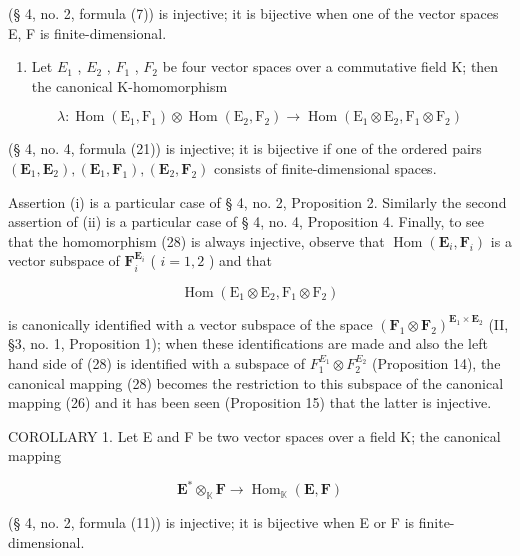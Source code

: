 (§ 4, no. 2, formula (7)) is injective; it is bijective when one of the vector spaces E, F is finite-dimensional.

\begin{enumerate}
\def\labelenumi{(\roman{enumi})}
\setcounter{enumi}{1}
\tightlist
\item
  Let \(E_{1}\) , \(E_{2}\) , \(F_{1}\) , \(F_{2}\) be four vector spaces over a commutative field K; then the canonical K-homomorphism
\end{enumerate}

\[
\lambda : \operatorname{Hom} \left(\mathrm{E} _ {1}, \mathrm{F} _ {1}\right) \otimes \operatorname{Hom} \left(\mathrm{E} _ {2}, \mathrm{F} _ {2}\right)\rightarrow \operatorname{Hom} \left(\mathrm{E} _ {1} \otimes \mathrm{E} _ {2}, \mathrm{F} _ {1} \otimes \mathrm{F} _ {2}\right)\tag{28}
\]

(§ 4, no. 4, formula (21)) is injective; it is bijective if one of the ordered pairs \((\mathbf{E}_1, \mathbf{E}_2), (\mathbf{E}_1, \mathbf{F}_1), (\mathbf{E}_2, \mathbf{F}_2)\) consists of finite-dimensional spaces.

Assertion (i) is a particular case of § 4, no. 2, Proposition 2. Similarly the second assertion of (ii) is a particular case of § 4, no. 4, Proposition 4. Finally, to see that the homomorphism (28) is always injective, observe that \(\operatorname{Hom}(\mathbf{E}_i, \mathbf{F}_i)\) is a vector subspace of \(\mathbf{F}_i^{\mathbf{E}_i}\) ( \(i = 1, 2\) ) and that

\[
\operatorname{Hom} \left(\mathrm{E} _ {1} \otimes \mathrm{E} _ {2}, \mathrm{F} _ {1} \otimes \mathrm{F} _ {2}\right)
\]

is canonically identified with a vector subspace of the space \((\mathbf{F}_{1} \otimes \mathbf{F}_{2})^{\mathbf{E}_{1} \times \mathbf{E}_{2}}\) (II, §3, no. 1, Proposition 1); when these identifications are made and also the left hand side of (28) is identified with a subspace of \(F_{1}^{E_{1}} \otimes F_{2}^{E_{2}}\) (Proposition 14), the canonical mapping (28) becomes the restriction to this subspace of the canonical mapping (26) and it has been seen (Proposition 15) that the latter is injective.

COROLLARY 1. Let E and F be two vector spaces over a field K; the canonical mapping

\[
\mathbf {E} ^ {*} \otimes_ {\mathbb {K}} \mathbf {F} \rightarrow \operatorname{Hom} _ {\mathbb {K}} (\mathbf {E}, \mathbf {F})
\]

(§ 4, no. 2, formula (11)) is injective; it is bijective when E or F is finite-dimensional.

